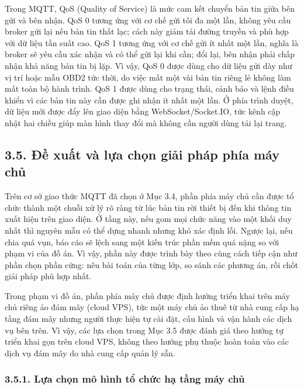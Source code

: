 \documentclass[a4paper]{extarticle}
\begin{document}
Trong MQTT, QoS (Quality of Service) là mức cam kết chuyển bản tin giữa bên gửi và bên nhận. QoS 0 tương ứng với cơ chế gửi tối đa một lần, không yêu cầu broker gửi lại nếu bản tin thất lạc; cách này giảm tải đường truyền và phù hợp với dữ liệu tần suất cao. QoS 1 tương ứng với cơ chế gửi ít nhất một lần, nghĩa là broker sẽ yêu cầu xác nhận và có thể gửi lại khi cần; đổi lại, bên nhận phải chấp nhận khả năng bản tin bị lặp. Vì vậy, QoS 0 được dùng cho dữ liệu gửi dày như vị trí hoặc mẫu OBD2 tức thời, do việc mất một vài bản tin riêng lẻ không làm mất toàn bộ hành trình. QoS 1 được dùng cho trạng thái, cảnh báo và lệnh điều khiển vì các bản tin này cần được ghi nhận ít nhất một lần. Ở phía trình duyệt, dữ liệu mới được đẩy lên giao diện bằng WebSocket/Socket.IO, tức kênh cập nhật hai chiều giúp màn hình thay đổi mà không cần người dùng tải lại trang.

\subsection{3.5. Đề xuất và lựa chọn giải pháp phía máy chủ}\label{ux111ux1ec1-xuux1ea5t-vuxe0-lux1ef1a-chux1ecdn-giux1ea3i-phuxe1p-phuxeda-muxe1y-chux1ee7}

Trên cơ sở giao thức MQTT đã chọn ở Mục 3.4, phần phía máy chủ cần được tổ chức
thành một chuỗi xử lý rõ ràng từ lúc bản tin rời thiết bị đến khi thông tin
xuất hiện trên giao diện. Ở tầng này, nếu
gom mọi chức năng vào một khối duy nhất thì nguyên mẫu có thể dựng nhanh nhưng
khó xác định lỗi. Ngược lại, nếu chia quá vụn, báo cáo sẽ lệch sang một kiến
trúc phần mềm quá nặng so với phạm vi của đồ án. Vì vậy, phần này được trình
bày theo cùng cách tiếp cận như phần chọn phần cứng: nêu bài toán của từng lớp,
so sánh các phương án, rồi chốt giải pháp phù hợp nhất.

Trong phạm vi đồ án, phần phía máy chủ được định hướng triển khai trên máy chủ
riêng ảo đám mây (cloud VPS), tức một máy chủ ảo thuê từ nhà cung cấp hạ tầng
đám mây nhưng người thực hiện tự cài đặt, cấu hình và vận hành các dịch vụ bên
trên. Vì vậy, các lựa chọn trong Mục 3.5 được đánh giá theo hướng tự triển khai
gọn trên cloud VPS, không theo hướng phụ thuộc hoàn toàn vào các dịch vụ đám mây
do nhà cung cấp quản lý sẵn.

\subsubsection{3.5.1. Lựa chọn mô hình tổ chức hạ tầng máy chủ}\label{lux1ef1a-chux1ecdn-muxf4-huxecnh-tux1ed5-chux1ee9c-hux1ea1-tux1ea7ng-muxe1y-chux1ee7}
\end{document}
